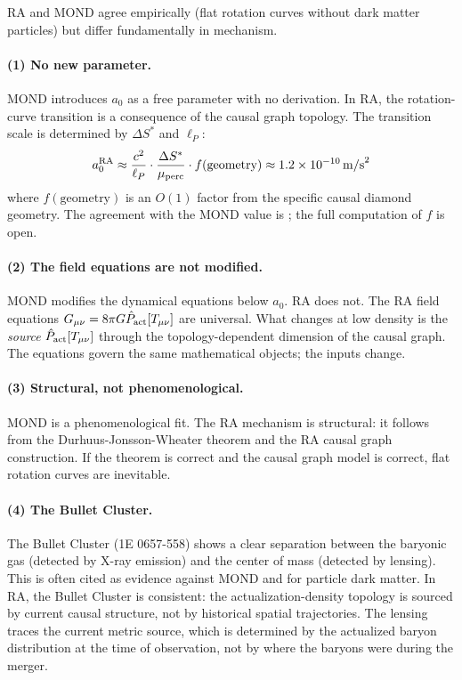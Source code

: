 \documentclass[12pt,a4paper]{article}
\begin{document}
RA and MOND agree empirically (flat rotation curves without dark matter particles) but differ fundamentally in mechanism.

\paragraph{(1) No new parameter.}
MOND introduces $a_0$ as a free parameter with no derivation.  In RA, the rotation-curve transition is a consequence of the causal graph topology.  The transition scale is determined by $\Delta S^*$ and $\ell_P$:
\begin{equation}
  a_0^{\rm RA} \approx \frac{c^2}{\ell_P}\cdot\frac{\Delta S^*}{\mu_{\rm perc}}\cdot f(\text{geometry}) \approx 1.2\times10^{-10}\,\mathrm{m/s}^2
  \label{eq:a0_RA}
\end{equation}
where $f(\text{geometry})$ is an $O(1)$ factor from the specific causal diamond geometry.  The agreement with the MOND value is \statusAR; the full computation of $f$ is open.

\paragraph{(2) The field equations are not modified.}
MOND modifies the dynamical equations below $a_0$.  RA does not.  The RA field equations $G_{\mu\nu}=8\pi G\hat{P}_{\mathrm{act}}[T_{\mu\nu}]$ are universal.  What changes at low density is the \emph{source} $\hat{P}_{\mathrm{act}}[T_{\mu\nu}]$ through the topology-dependent dimension of the causal graph.  The equations govern the same mathematical objects; the inputs change.

\paragraph{(3) Structural, not phenomenological.}
MOND is a phenomenological fit.  The RA mechanism is structural: it follows from the Durhuus-Jonsson-Wheater theorem and the RA causal graph construction.  If the theorem is correct and the causal graph model is correct, flat rotation curves are inevitable.

\paragraph{(4) The Bullet Cluster.}
The Bullet Cluster (1E 0657-558) shows a clear separation between the baryonic gas (detected by X-ray emission) and the center of mass (detected by lensing).  This is often cited as evidence against MOND and for particle dark matter.  In RA, the Bullet Cluster is consistent: the actualization-density topology is sourced by current causal structure, not by historical spatial trajectories.  The lensing traces the current metric source, which is determined by the actualized baryon distribution at the time of observation, not by where the baryons were during the merger.
\end{document}

